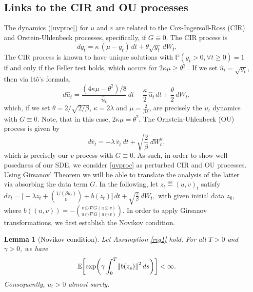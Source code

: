 \documentclass[11pt, twoside]{report}
\newtheorem{lemma}[theorem]{Lemma}
\begin{document}
\subsection{Links to the CIR and OU processes}
The dynamics (\ref{uvproc}) for $u$ and $v$ are related to the Cox-Ingersoll-Ross (CIR) and Orstein-Uhlenbeck processes, specifically, if $G \equiv 0$. The CIR process is
\begin{equation}\label{eq:cir1}
    dy_t = \kappa\,(\mu-y_t) \,dt + \theta \sqrt{y_t} \,dW_t.
\end{equation}
The CIR process is known to have unique solutions with $\mathbb{P}(y_t > 0, \forall t \geq 0) = 1$ if and only if the Feller test holds, which occurs for $2\kappa \mu \geq \theta^2$ \cite{Gikhman2011}.  If we set $\hat{u}_t = \sqrt{y_t}$, then via It\^{o}'s formula,
\begin{equation}\label{eq:cir_2}
    d\hat u_t = \frac{(4\kappa \mu-\theta^2)/8}{\hat u_t}\,dt -\frac{\kappa}{2}\,\hat u_t \,dt + \frac{\theta}{2} \,dW_t,
\end{equation}
which, if we set $\theta = 2/\sqrt{2/\beta}$, $\kappa = 2\lambda$ and $\mu = \frac{2}{\beta \lambda}$, are precisely the $u_t$ dynamics with $G \equiv 0$. Note, that in this case, $2\kappa \mu = \theta^2$. The Ornstein-Uhlenbeck (OU) process is given by
$$
d\hat v_t =-\lambda\, \hat v_t\, dt + \sqrt{\frac{2}{\beta}}\,dW_t^2,
$$
which is precisely our $v$ process with $G \equiv 0$. As such, in order to show well-posedness of our SDE, we consider \ref{uvproc} as perturbed CIR and OU processes. Using Girsanov' Theorem we will be able to translate the analysis of the latter via absorbing the data term $G$. In the following, 
let $z_t \eqdef (u,v)_t$ satisfy
$
dz_t = \biggl[-\lambda z_t + \binom{1/(\beta u_t)}{0} + b(z_t)\biggr]\,dt + \sqrt{\frac{2}{\beta}} \,dW_t,
$
with given initial data $z_0$, 
where $b((u,v)) = -\binom{v\odot \nabla G(u\odot v)}{u\odot \nabla G(u\odot v)}$. 
In order to apply  Girsanov transformations, we first establish the Novikov condition.
\begin{lemma}[Novikov condition]\label{lem:novikov}
    Let Assumption \ref{reg1} hold. For all $T>0$ and $\gamma>0$, we have
    $$
    \EE\biggl[ \exp\biggl(\gamma \int_0^T \norm{b(z_s)}^2 \,ds\biggr) \biggr] <\infty.
    $$
    Consequently, $u_t>0$ almost surely.
\end{lemma}
\end{document}
